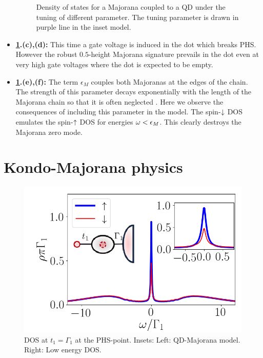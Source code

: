 \begin{itemize}
\begin{figure}[h]
     \caption{Density of states for a Majorana coupled to a QD under the tuning of different parameter. The tuning parameter is drawn in purple line in the inset model.  \label{fig:M1-Tot} \protect{}}
\end{figure}

  
    \item\textbf{ \ref{fig:M1-Tot}.(c),(d):} This time a gate voltage is induced in the dot which breaks PHS. However the robust $0.5$-height Majorana signature prevails in the dot even at very high gate voltages where the dot is expected to be empty.
    
    \item\textbf{ \ref{fig:M1-Tot}.(e),(f):} The term $\epsilon_M$ couples both Majoranas at the edges of the chain. The strength of this parameter decays exponentially with the length of the Majorana  chain so that it is often neglected . Here we observe the consequences of including this parameter in the model. The spin-$\downarrow$ DOS emulates the spin-$\uparrow$ DOS for energies $\omega < \epsilon_M$. This clearly destroys the Majorana zero mode.   
\end{itemize}







\section{Kondo-Majorana physics}
\begin{figure}[t]
\centering
\includegraphics[scale=0.5]{IMAGES/Majorana/NRG_M1.png}
\caption{ \label{fig:NRG-1M} DOS at $t_1 = \Gamma_1$ at the PHS-point.  Insets: Left: QD-Majorana model. Right: Low energy DOS. \protect{}}

\end{figure}

